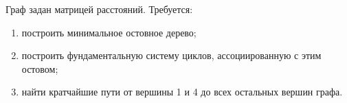 \question
Граф задан матрицей расстояний. Требуется:
\begin{enumerate}
\item построить минимальное остовное дерево;
\item построить фундаментальную систему циклов, ассоциированную с этим остовом;
\item найти кратчайшие пути от вершины 1 и 4 до всех остальных вершин графа.
\end{enumerate}
\begin{figure}[h]

\begin{minipage}[h]{0.55\linewidth}
\end{minipage}
\begin{minipage}[h]{0.45\linewidth}
\end{minipage}
\end{figure}
